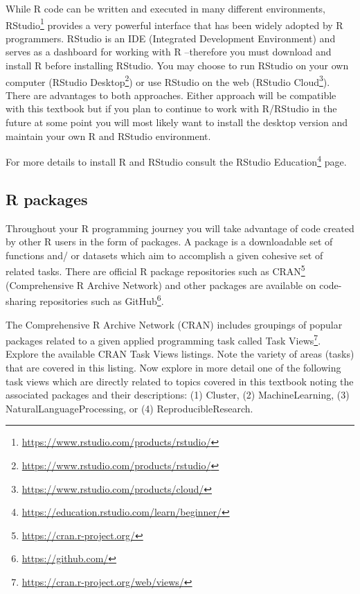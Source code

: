 \documentclass[
  letterpaper,
]{scrbook}
\DeclareRobustCommand{\href}[2]{#2\footnote{\url{#1}}}
\begin{document}
While R code can be written and executed in many different environments,
\href{https://www.rstudio.com/products/rstudio/}{RStudio} provides a
very powerful interface that has been widely adopted by R programmers.
RStudio is an IDE (Integrated Development Environment) and serves as a
dashboard for working with R --therefore you must download and install R
before installing RStudio. You may choose to run RStudio on your own
computer (\href{https://www.rstudio.com/products/rstudio/}{RStudio
Desktop}) or use RStudio on the web
(\href{https://www.rstudio.com/products/cloud/}{RStudio Cloud}). There
are advantages to both approaches. Either approach will be compatible
with this textbook but if you plan to continue to work with R/RStudio in
the future at some point you will most likely want to install the
desktop version and maintain your own R and RStudio environment.

For more details to install R and RStudio consult the
\href{https://education.rstudio.com/learn/beginner/}{RStudio Education}
page.

\hypertarget{r-packages}{%
\subsection*{R packages}\label{r-packages}}

Throughout your R programming journey you will take advantage of code
created by other R users in the form of packages. A package is a
downloadable set of functions and/ or datasets which aim to accomplish a
given cohesive set of related tasks. There are official R package
repositories such as \href{https://cran.r-project.org/}{CRAN}
(Comprehensive R Archive Network) and other packages are available on
code-sharing repositories such as \href{https://github.com/}{GitHub}.

\begin{tcolorbox}[enhanced jigsaw, title=\textcolor{quarto-callout-note-color}{\faInfo}\hspace{0.5em}{Consider}, breakable, colback=white, colframe=quarto-callout-note-color-frame, bottomrule=.15mm, left=2mm, bottomtitle=1mm, colbacktitle=quarto-callout-note-color!10!white, opacityback=0, arc=.35mm, toprule=.15mm, coltitle=black, leftrule=.75mm, opacitybacktitle=0.6, toptitle=1mm, titlerule=0mm, rightrule=.15mm]

The Comprehensive R Archive Network (CRAN) includes groupings of popular
packages related to a given applied programming task called
\href{https://cran.r-project.org/web/views/}{Task Views}. Explore the
available CRAN Task Views listings. Note the variety of areas (tasks)
that are covered in this listing. Now explore in more detail one of the
following task views which are directly related to topics covered in
this textbook noting the associated packages and their descriptions: (1)
Cluster, (2) MachineLearning, (3) NaturalLanguageProcessing, or (4)
ReproducibleResearch.

\end{tcolorbox}
\end{document}
